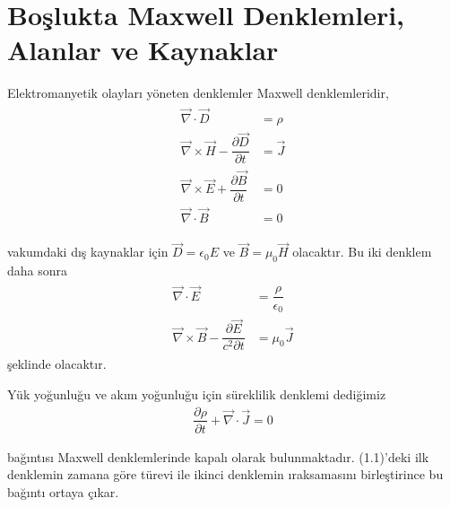 \section{Boşlukta Maxwell Denklemleri, Alanlar ve Kaynaklar}

Elektromanyetik olayları yöneten denklemler Maxwell denklemleridir,
\begin{align}
\begin{aligned}
   \Vec{\nabla} \cdot \Vec{D}  & = \rho \\
   \Vec{\nabla} \times \Vec{H} - \dfrac{\partial \Vec{D}}{\partial t}  & = \Vec{J} \\
   \Vec{\nabla} \times \Vec{E} + \dfrac{\partial \Vec{B}}{\partial t} &  = 0 \\
   \Vec{\nabla} \cdot \Vec{B} &  = 0
   \end{aligned}
\end{align}

vakumdaki dış kaynaklar için $\Vec{D} = \epsilon_{0} E $ ve $ \Vec{B} = \mu_{0}\Vec{H}$ olacaktır. Bu iki denklem daha sonra
\begin{align}
\begin{aligned}
   \Vec{\nabla} \cdot \Vec{E}  & = \dfrac{\rho}{\epsilon_{0}} \\
   \Vec{\nabla} \times \Vec{B} - \dfrac{\partial \Vec{E}}{c^{2} \partial t}  & = \mu_{0} \Vec{J}
       \end{aligned}
\end{align}
şeklinde olacaktır.

\newpage

Yük yoğunluğu ve akım yoğunluğu için süreklilik denklemi dediğimiz
\begin{align}
    \dfrac{\partial \rho}{\partial t} + \Vec{\nabla} \cdot \Vec{J} = 0
\end{align}

bağıntısı Maxwell denklemlerinde kapalı olarak bulunmaktadır. (1.1)'deki ilk denklemin zamana göre türevi ile ikinci denklemin
ıraksamasını birleştirince bu bağıntı ortaya çıkar.

